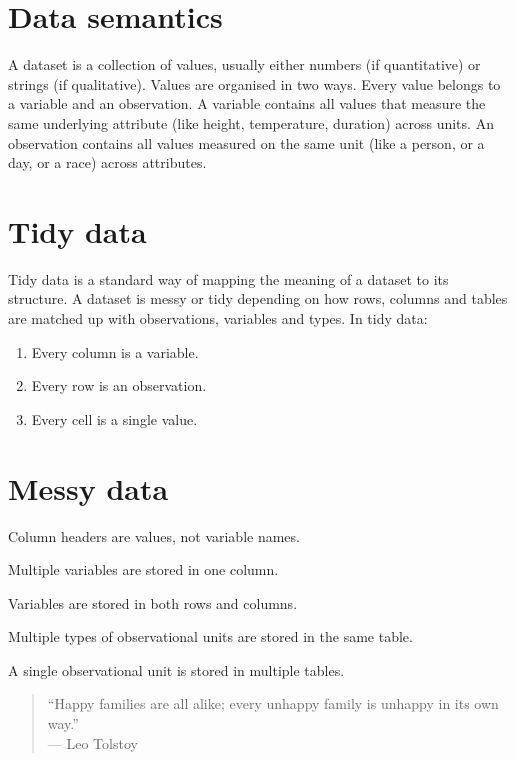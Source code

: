 \documentclass[
]{book}
\begin{document}
\hypertarget{data-semantics}{%
\section{Data semantics}\label{data-semantics}}

A dataset is a collection of values, usually either numbers (if quantitative) or strings (if qualitative). Values are organised in two ways. Every value belongs to a variable and an observation. A variable contains all values that measure the same underlying attribute (like height, temperature, duration) across units. An observation contains all values measured on the same unit (like a person, or a day, or a race) across attributes.

\hypertarget{tidy-data}{%
\section{Tidy data}\label{tidy-data}}

Tidy data is a standard way of mapping the meaning of a dataset to its structure. A dataset is messy or tidy depending on how rows, columns and tables are matched up with observations, variables and types. In tidy data:

\begin{enumerate}
\def\labelenumi{\arabic{enumi}.}
\item
  Every column is a variable.
\item
  Every row is an observation.
\item
  Every cell is a single value.
\end{enumerate}

\hypertarget{messy-data}{%
\section{Messy data}\label{messy-data}}

Column headers are values, not variable names.

Multiple variables are stored in one column.

Variables are stored in both rows and columns.

Multiple types of observational units are stored in the same table.

A single observational unit is stored in multiple tables.

\begin{quote}
``Happy families are all alike; every unhappy family is unhappy in its own way.''\\
--- Leo Tolstoy
\end{quote}
\end{document}
